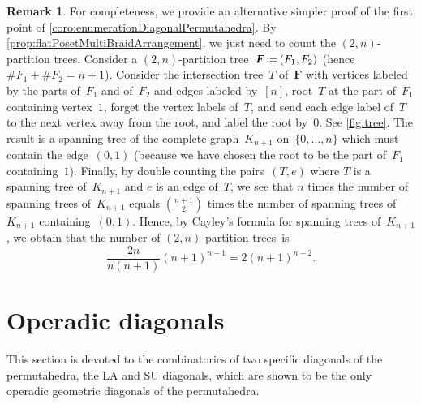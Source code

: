 \documentclass{amsart}
\theoremstyle{definition}
\newtheorem{remark}[theorem]{Remark}
\renewcommand{\b}[1]{{\boldsymbol{#1}}} %
\newcommand{\eqdef}{\mbox{\,\raisebox{0.2ex}{\scriptsize\ensuremath{\mathrm:}}\ensuremath{=}\,}} %
\newcommand{\card}[1]{\##1} %
\renewcommand{\b}[1]{\boldsymbol{#1}} %
\newcommand{\SU}{\mathrm{SU}}
\newcommand{\LA}{\mathrm{LA}}
\begin{document}
\begin{remark}
For completeness, we provide an alternative simpler proof of the first point of \cref{coro:enumerationDiagonalPermutahedra}.
By \cref{prop:flatPosetMultiBraidArrangement}, we just need to count the $(2,n)$-partition trees.
Consider a $(2,n)$-partition tree~$\b{F} \eqdef (F_1,F_2)$ (hence~$\card{F_1} + \card{F_2} = n + 1$).
Consider the intersection tree~$T$ of~$\b{F}$ with vertices labeled by the parts of~$F_1$ and of~$F_2$ and edges labeled by~$[n]$, root~$T$ at the part of~$F_1$ containing vertex~$1$, forget the vertex labels of~$T$, and send each edge label of~$T$ to the next vertex away from the root, and label the root by~$0$.
See \cref{fig:tree}.
The result is a spanning tree of the complete graph~$K_{n+1}$ on~$\{0, \dots, n\}$ which must contain the edge~$(0,1)$ (because we have chosen the root to be the part of~$F_1$ containing~$1$).
%
%
Finally, by double counting the pairs~$(T,e)$ where $T$ is a spanning tree of~$K_{n+1}$ and $e$ is an edge of~$T$, we see that $n$ times the number of spanning trees of~$K_{n+1}$ equals $\binom{n+1}{2}$ times the number of spanning trees of~$K_{n+1}$ containing~$(0,1)$.
Hence, by Cayley's formula for spanning trees of~$K_{n+1}$, we obtain that the number of $(2,n)$-partition trees~is
\[
\frac{2n}{n(n+1)} (n+1)^{n-1} = 2 (n + 1)^{n-2}.
\]
\end{remark}


\pagebreak
\section{Operadic diagonals}
\label{sec:operadicDiagonals}

This section is devoted to the combinatorics of two specific diagonals of the permutahedra, the $\LA$ and $\SU$ diagonals, which are shown to be the only operadic geometric diagonals of the permutahedra.
\end{document}
